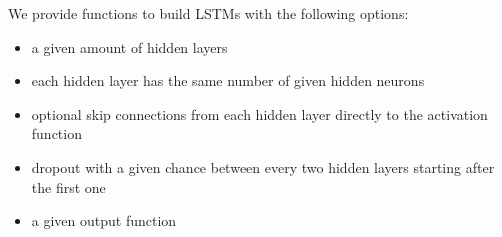 We provide functions to build
LSTMs with the following options:
\begin{itemize}
\item a given amount of hidden layers
\item each hidden layer has the same number of given hidden neurons
\item optional skip connections from each hidden layer directly
  to the activation function
\item dropout with a given chance between every two hidden layers
  starting after the first one
\item a given output function
\end{itemize}



